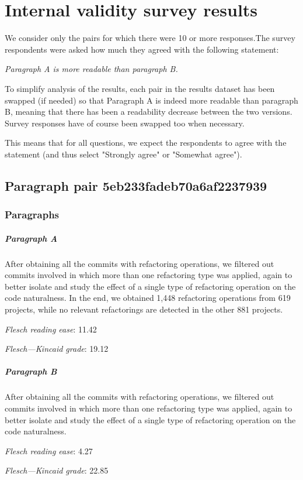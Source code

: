 \chapter{Internal validity survey results\label{app:survey-results}}

We consider only the pairs for which there were 10 or more responses.The survey respondents were asked how much they agreed with the following statement:

\begin{displayquote}
\emph{Paragraph A is more readable than paragraph B.}
\end{displayquote}

To simplify analysis of the results, each pair in the results dataset has been swapped (if needed) so that Paragraph A is indeed more readable than paragraph B, meaning that there has been a readability decrease between the two versions. Survey responses have of course been swapped too when necessary.

This means that for all questions, we expect the respondents to agree with the statement (and thus select "Strongly agree" or "Somewhat agree").

\section{Paragraph pair 5eb233fadeb70a6af2237939}
\subsection{Paragraphs}
\paragraph{Paragraph A}
After obtaining all the commits with refactoring operations, we filtered out commits involved in which more than one refactoring type was applied, again to better isolate and study the effect of a single type of refactoring operation on the code naturalness. In the end, we obtained 1,448 refactoring operations from 619 projects, while no relevant refactorings are detected in the other 881 projects.\par\medskip
\emph{Flesch reading ease}: 11.42\par
\emph{Flesch---Kincaid grade}: 19.12

\paragraph{Paragraph B}
After obtaining all the commits with refactoring operations, we filtered out commits involved in which more than one refactoring type was applied, again to better isolate and study the effect of a single type of refactoring operation on the code naturalness.\par\medskip
\emph{Flesch reading ease}: 4.27\par
\emph{Flesch---Kincaid grade}: 22.85

